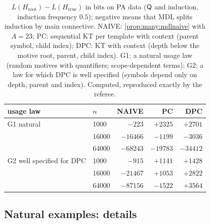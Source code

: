 \begin{table}[ht]
\centering
\caption{$L(H_{\mathrm{root}})-L(H_{\mathrm{true}})$ in bits on PA data ($\mathsf{Q}$ and induction, induction frequency $0.5$);
negative means that MDL splits induction by main connective. NAIVE: \cref{prop:many:mdlnaive} with $A=23$; PC: sequential
KT per template with context (parent symbol, child index); DPC: KT with context (depth below the motive root, parent, child
index). G1: a natural usage law (random motives with quantifiers; scope-dependent terms); G2: a law for which DPC is well
specified (symbols depend only on depth, parent and index). Computed, reproduced exactly by the
referee.}\label{tab:many:mdl}
\begin{tabular}{llrrr}
\toprule
usage law & $n$ & NAIVE & PC & DPC\\
\midrule
G1 natural & 1000 & $-223$ & $+2325$ & $+2701$\\
 & 16000 & $-16466$ & $-1199$ & $-3036$\\
 & 64000 & $-68243$ & $-19783$ & $-34412$\\
G2 well specified for DPC & 1000 & $-915$ & $+1141$ & $+1428$\\
 & 16000 & $-21467$ & $+1053$ & $+2822$\\
 & 64000 & $-87156$ & $-1522$ & $+3564$\\
\bottomrule
\end{tabular}
\end{table}

\subsection{Natural examples: details}\label{app:many:examples}

